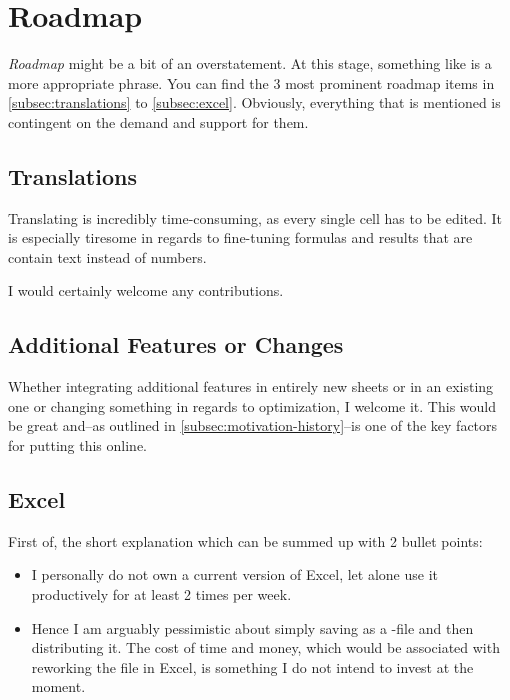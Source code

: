 \section{Roadmap}
\label{sec:roadmap}

\emph{Roadmap} might be a bit of an overstatement.
At this stage, something like  is a more appropriate phrase.
You can find the 3 most prominent roadmap items in \autoref{subsec:translations} to \autoref{subsec:excel}.
Obviously, everything that is mentioned is contingent on the demand and support for them.

\subsection{Translations}
\label{subsec:translations}

Translating \tfn is incredibly time-consuming, as every single cell has to be edited.
It is especially tiresome in regards to fine-tuning formulas and results that are contain text instead of numbers.

I would certainly welcome any contributions.

\subsection{Additional Features or Changes}
\label{subsec:additional-features}

Whether integrating additional features in entirely new sheets or in an existing one or changing something in regards to optimization, I welcome it.
This would be great and--as outlined in \autoref{subsec:motivation-history}--is one of the key factors for putting this online.

\subsection{Excel}
\label{subsec:excel}

First of, the short explanation which can be summed up with 2 bullet points:
\begin{itemize}
	\item I personally do not own a current version of Excel, let alone use it productively for at least 2 times per week.
	\item Hence I am arguably pessimistic about simply saving \tfn as a -file and then distributing it.
	The cost of time and money, which would be associated with reworking the file in Excel, is something I do not intend to invest at the moment.
\end{itemize}

